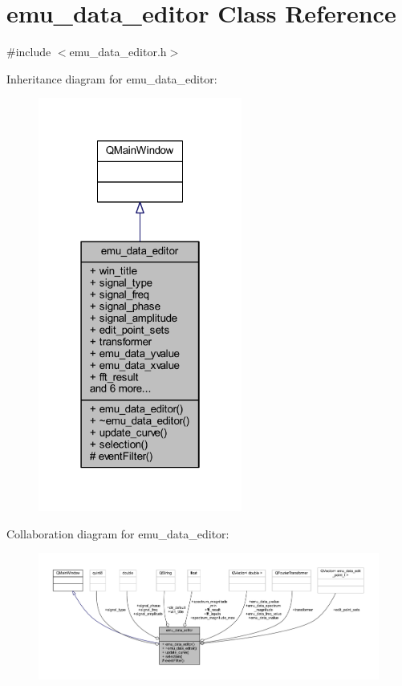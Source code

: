 \hypertarget{a00004}{\section{emu\+\_\+data\+\_\+editor Class Reference}
\label{a00004}
}


{\ttfamily \#include $<$emu\+\_\+data\+\_\+editor.\+h$>$}



Inheritance diagram for emu\+\_\+data\+\_\+editor\+:
\nopagebreak
\begin{figure}[H]
\begin{center}
\leavevmode
\includegraphics[width=190pt]{d3/d58/a00285}
\end{center}
\end{figure}


Collaboration diagram for emu\+\_\+data\+\_\+editor\+:
\nopagebreak
\begin{figure}[H]
\begin{center}
\leavevmode
\includegraphics[width=350pt]{d5/d7b/a00286}
\end{center}
\end{figure}
